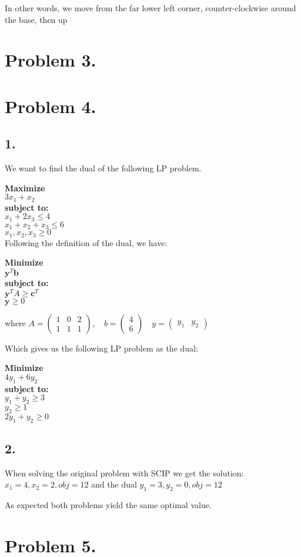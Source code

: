 \documentclass[12pt]{report}
\begin{document}
In other words, we move from the far lower left corner, counter-clockwise around the base, then up

\section*{Problem 3.}

\section*{Problem 4.}

\subsection*{1.}

We want to find the dual of the following LP problem.

\textbf{Maximize}\\
  $3x_1 + x_2$\\
\textbf{subject to:}\\
  $ x_1 + 2x_3 \le 4 $ \\
  $ x_1 + x_2 + x_3\le 6 $ \\
  $ x_1,x_2,x_3 \ge 0 $ \\

Following the definition of the dual, we have:

\textbf{Minimize}\\
  $\textbf{y}^T \textbf{b} $\\
\textbf{subject to:}\\
  $ \textbf{y}^T A \ge \textbf{c}^T $ \\
  $ \textbf{y} \ge 0 $ 

where $A = \left(
\begin{matrix}
  1 & 0 & 2 \\
  1 & 1 & 1 
\end{matrix}
\right),
\quad 
b = \left(
\begin{matrix}
  4 \\
  6 
\end{matrix}
\right)
\quad 
y = \left(
\begin{matrix}
  y_1 & y_2  
\end{matrix}
\right) $ 

Which gives us the following LP problem as the dual:

\textbf{Minimize}\\
  $ 4y_1 + 6y_2 $\\
\textbf{subject to:}\\
  $ y_1 + y_2  \ge 3 $ \\
  $ y_2        \ge 1 $ \\
  $ 2y_1 + y_2 \ge 0 $ 

\subsection*{2.}

When solving the original problem with SCIP we get the solution:
$ x_1 = 4, x_2 = 2, obj = 12$
and the dual
$ y_1 = 3, y_2 = 0, obj = 12$

As expected both problems yield the same optimal value.



\section*{Problem 5.}
\end{document}
